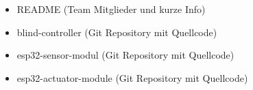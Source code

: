 \setcounter{chapter}{1}
\setcounter{section}{0}
\setcounter{table}{0}
\setcounter{figure}{0}

\begin{itemize}
	\item README (Team Mitglieder und kurze Info)
	\item blind-controller (Git Repository mit Quellcode)
	\item esp32-sensor-modul (Git Repository mit Quellcode)
	\item esp32-actuator-module (Git Repository mit Quellcode)
\end{itemize}